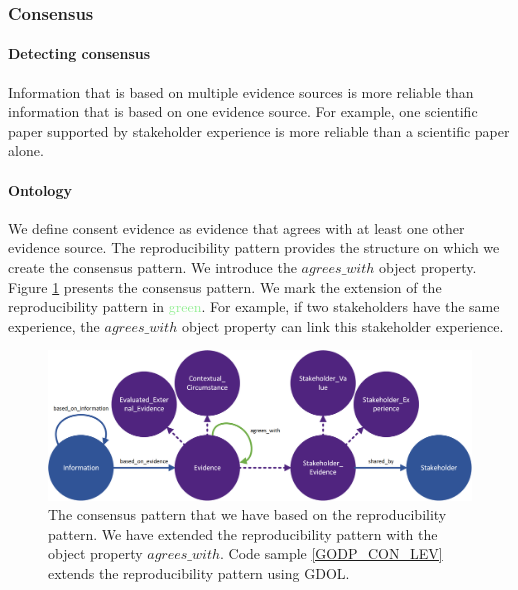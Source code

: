 \subsubsection{Consensus} \label{odp_consensus}
\paragraph{Detecting consensus}
Information that is based on multiple evidence sources is more reliable than information that is based on one evidence source. For example, one scientific paper supported by stakeholder experience is more reliable than a scientific paper alone. 

\begin{center}
\large\color{document}{The consensus pattern validates the evidence reliability by detecting when evidence does not agree with at least one additional evidence source.}
\end{center}

\paragraph{Ontology}
We define consent evidence as evidence that agrees with at least one other evidence source. The reproducibility pattern provides the structure on which we create the consensus pattern. We introduce the $agrees\_with$ object property. Figure \ref{fig:consensus} presents the consensus pattern. We mark the extension of the reproducibility pattern in \textcolor{LightGreen}{green}. For example, if two stakeholders have the same experience, the $agrees\_with$ object property can link this stakeholder experience. 

\begin{figure}[H]
\centering
  \includegraphics[width=14cm]{../../Images/04_Contribution/04_Consensus_Ontology.png}
  \caption{The consensus pattern that we have based on the reproducibility pattern. We have extended the reproducibility pattern with the object property $agrees\_with$. Code sample \ref{GODP_CON_LEV} extends the reproducibility pattern using GDOL.}
  \label{fig:consensus}
\end{figure}

